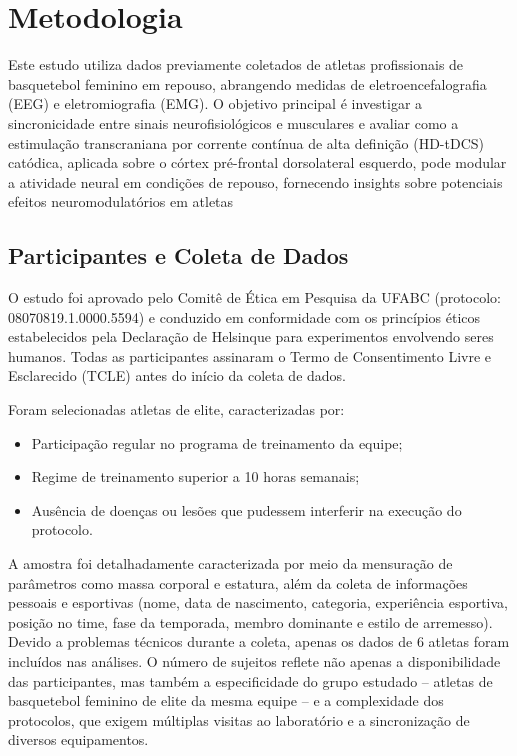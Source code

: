 \chapter{Metodologia}
\label{chap:metodologia}

Este estudo utiliza dados previamente coletados de atletas profissionais de basquetebol feminino em repouso, abrangendo medidas de eletroencefalografia (EEG) e eletromiografia (EMG). O objetivo principal é investigar a sincronicidade entre sinais neurofisiológicos e musculares e avaliar como a estimulação transcraniana por corrente contínua de alta definição (HD-tDCS) catódica, aplicada sobre o córtex pré-frontal dorsolateral esquerdo, pode modular a atividade neural em condições de repouso, fornecendo insights sobre potenciais efeitos neuromodulatórios em atletas

\section{Participantes e Coleta de Dados}

O estudo foi aprovado pelo Comitê de Ética em Pesquisa da UFABC (protocolo: 08070819.1.0000.5594) e conduzido em conformidade com os princípios éticos estabelecidos pela Declaração de Helsinque para experimentos envolvendo seres humanos. Todas as participantes assinaram o Termo de Consentimento Livre e Esclarecido (TCLE) antes do início da coleta de dados.

Foram selecionadas atletas de elite, caracterizadas por:
\begin{itemize}
    \item Participação regular no programa de treinamento da equipe;
    \item Regime de treinamento superior a 10 horas semanais;
    \item Ausência de doenças ou lesões que pudessem interferir na execução do protocolo.
\end{itemize}

A amostra foi detalhadamente caracterizada por meio da mensuração de parâmetros como massa corporal e estatura, além da coleta de informações pessoais e esportivas (nome, data de nascimento, categoria, experiência esportiva, posição no time, fase da temporada, membro dominante e estilo de arremesso). Devido a problemas técnicos durante a coleta, apenas os dados de 6 atletas foram incluídos nas análises. O número de sujeitos reflete não apenas a disponibilidade das participantes, mas também a especificidade do grupo estudado – atletas de basquetebol feminino de elite da mesma equipe – e a complexidade dos protocolos, que exigem múltiplas visitas ao laboratório e a sincronização de diversos equipamentos.

